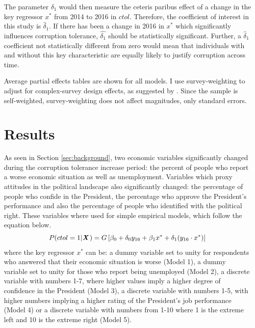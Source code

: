 \documentclass[12pt,a4]{article}\usepackage[]{graphicx}\usepackage[]{xcolor}
\begin{document}
The parameter $\delta_1$ would then measure the ceteris paribus effect of a change in the key regressor $x^*$ from 2014 to 2016 in $ctol$. Therefore, the coefficient of interest in this study is $\widehat{\delta}_1$. If there has been a change in 2016 in $x^*$ which significantly influences corruption tolerance, $\widehat{\delta_1}$ should be statistically significant. Further, a $\widehat{\delta}_1$ coefficient not statistically different from zero would mean that individuals with and without this key characteristic are equally likely to justify corruption across time. 

Average partial effects tables are shown for all models. I use survey-weighting to adjust for complex-survey design effects, as suggested by \textcite{Castorena.2021}. Since the sample is self-weighted, survey-weighting does not affect magnitudes, only standard errors.




\section{Results}
\label{sec:results}
As seen in Section \ref{sec:background}, two economic variables significantly changed during the corruption tolerance increase period: the percent of people who report a worse economic situation as well as unemployment. Variables which proxy attitudes in the political landscape also significantly changed: the percentage of people who confide in the President, the percentage who approve the President's performance and also the percentage of people who identified with the political right. These variables where used for simple empirical models, which follow the equation below.
\begin{equation}
\label{eqn:simplemod}
P(ctol = 1 | \textbf{\textit{X}} \hspace{0.04cm}) = G \left[ \beta_0 + \delta_0 y_{16} + \beta_1 x^* + \delta_1 (y_{16} \cdot x^*)\right]
\end{equation}
where the key regressor $x^*$ can be: a dummy variable set to unity for respondents who answered that their economic situation is worse (Model 1), a dummy variable set to unity for those who report being unemployed (Model 2), a discrete variable with numbers 1-7, where higher values imply a higher degree of confidence in the President (Model 3), a discrete variable with numbers 1-5, with higher numbers implying a higher rating of the President's job performance (Model 4) or a discrete variable with numbers from 1-10 where 1 is the extreme left and 10 is the extreme right (Model 5). 
\end{document}
